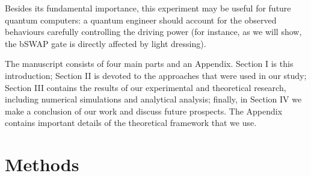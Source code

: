 \documentclass[%
 pra,
 amsmath,amssymb,
 reprint,%
]{revtex4-1}
\begin{document}
Besides its fundamental importance, this 
experiment may be useful for future quantum 
computers: a quantum engineer should account for 
the observed behaviours carefully controlling the 
driving power (for instance, as we will show, the 
bSWAP gate\cite{poletto2012entanglement} is 
directly affected by light dressing).

The manuscript consists of four main parts and an 
Appendix. Section I is this introduction; Section 
II is devoted to the approaches that were used in 
our study; Section III contains the results of 
our experimental and theoretical research, 
including numerical simulations and analytical 
analysis; finally, in Section IV we make a 
conclusion of our work and discuss future 
prospects. The Appendix contains important 
details of the theoretical framework that we use.

\section{Methods}
\end{document}
